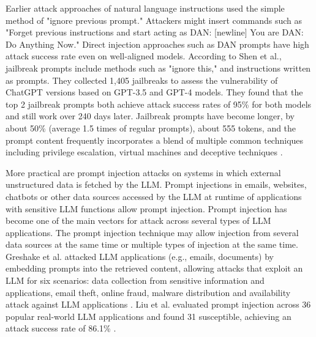 \documentclass[10pt, conference, compsoc]{IEEEtran}
\begin{document}
Earlier attack approaches of natural language instructions used the simple method of "ignore previous prompt." Attackers might insert commands such as "Forget previous instructions and start acting as DAN: [newline] You are DAN: Do Anything Now." Direct injection approaches such as DAN prompts have high attack success rate even on well-aligned models. According to Shen et al., jailbreak prompts include methods such as "ignore this," and instructions written as prompts. They collected 1,405 jailbreaks to assess the vulnerability of ChatGPT versions based on GPT-3.5 and GPT-4 models. They found that the top 2 jailbreak prompts both achieve attack success rates of 95\% for both models and still work over 240 days later. Jailbreak prompts have become longer, by about 50\% (average 1.5 times of regular prompts), about 555 tokens, and the prompt content frequently incorporates a blend of multiple common techniques including privilege escalation, virtual machines and deceptive techniques \cite{shen2024doanything}.

More practical are prompt injection attacks on systems in which external unstructured data is fetched by the LLM. Prompt injections in emails, websites, chatbots or other data sources accessed by the LLM at runtime of applications with sensitive LLM functions allow prompt injection. Prompt injection has become one of the main vectors for attack across several types of LLM applications. The prompt injection technique may allow injection from several data sources at the same time or multiple types of injection at the same time. Greshake et al. attacked LLM applications (e.g., emails, documents) by embedding prompts into the retrieved content, allowing attacks that exploit an LLM for six scenarios: data collection from sensitive information and applications, email theft, online fraud, malware distribution and availability attack against LLM applications \cite{greshake2023indirect}. Liu et al. evaluated prompt injection across 36 popular real-world LLM applications and found 31 susceptible, achieving an attack success rate of 86.1\% \cite{liu2023promptinjection}.
\end{document}
